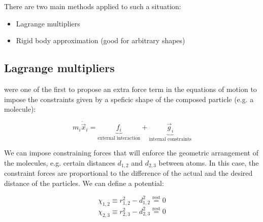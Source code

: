 There are two main methods applied to such a situation:
\begin{itemize}
\item Lagrange multipliers 
\item Rigid body approximation (good for arbitrary shapes)
\end{itemize}



\subsection{Lagrange multipliers}

\citet{lagrange} were one of the first to propose an extra force term in the equations of motion to impose the constraints given by a speficic shape of the composed particle (e.g. a molecule):

\begin{equation}
m_i\ddot{\vec{x}}_i = \underbrace{f_i}_{\text{external interaction}} + \underbrace{\vec{g}_i}_{\text{internal constraints}}
\end{equation}

We can impose constraining forces that will enforce the geometric arrangement of the molecules, e.g. certain distances $d_{1,2}$ and $d_{2,3}$ between atoms. In this case, the constraint forces are proportional to the difference of the actual and the desired distance of the particles. We can define a potential:

$$
\chi_{1,2} \equiv r^2_{1,2} -d^2_{1,2} \overset{\text{rest}}{=} 0
$$
\begin{equation}
\chi_{2,3} \equiv r^2_{2,3} -d^2_{2,3} \overset{\text{rest}}{=} 0
\end{equation}

